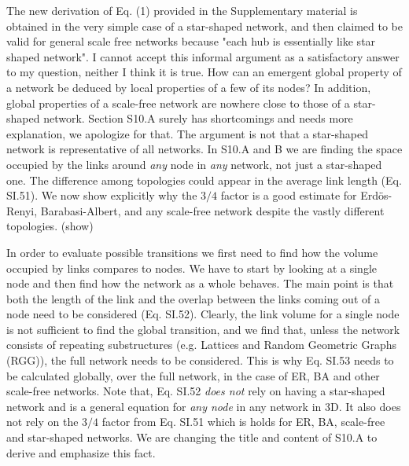 \documentclass[11pt]{article}
\begin{document}
\begin{response}{
The new derivation of Eq. (1) provided in the Supplementary material is obtained in the very simple case of a star-shaped network, and then claimed to be valid for general scale free networks because "each hub is essentially like star shaped 
network". 
I cannot accept this informal argument as a satisfactory answer to my question, neither I think it is true.
How can an emergent global property of a network be deduced by local properties of a few of its nodes? 
In addition, global properties of a scale-free network are nowhere close to 
those of a star-shaped network. 
}
Section S10.A surely has shortcomings and needs more explanation, we apologize for that. 
The argument is not that a star-shaped network is representative of all networks. 
In S10.A and B we are finding the space occupied by the links around {\em any} node in {\em any} network, not just a star-shaped one. 
The difference among topologies could appear in the average link length (Eq. SI.51).
{\color{red} We now show explicitly why the $3/4$ factor is a good estimate for Erd\"os-Renyi, Barabasi-Albert, and any scale-free network despite the vastly different topologies. (show)}

In order to evaluate possible transitions we first need to find how the volume occupied by links compares to nodes. 
We have to start by looking at a single node and then find how the network as a whole behaves. 
The main point is that both the length of the link and the overlap between the links coming out of a node need to be considered (Eq. SI.52). 
Clearly, the link volume for a single node is not sufficient to find the global transition, and we find that, unless the network consists of repeating substructures 
(e.g. Lattices and Random Geometric Graphs (RGG)), the full network needs to be considered. This is why Eq. SI.53 needs to be calculated globally, over the full network, in the case of ER, BA and other scale-free networks. 
Note that, Eq. SI.52 {\em does not} rely on having a star-shaped network and is a general equation for {\em any node} in any network in 3D.
It also does not rely on the $3/4$ factor from Eq. SI.51 which is holds for ER, BA, scale-free and star-shaped networks. 
{\color{red}
We are changing the title and content of S10.A to derive and emphasize this fact.} 

\end{response}
\end{document}
